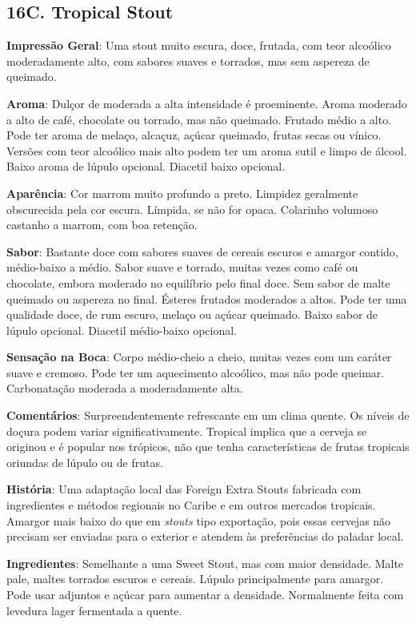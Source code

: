 \subsection*{16C. Tropical Stout}
\textbf{Impressão Geral}: Uma stout muito escura, doce, frutada, com teor alcoólico moderadamente alto, com sabores suaves e torrados, mas sem aspereza de queimado.

\textbf{Aroma}: Dulçor de moderada a alta intensidade é proeminente. Aroma moderado a alto de café, chocolate ou torrado, mas não queimado. Frutado médio a alto. Pode ter aroma de melaço, alcaçuz, açúcar queimado, frutas secas ou vínico. Versões com teor alcoólico mais alto podem ter um aroma sutil e limpo de álcool. Baixo aroma de lúpulo opcional. Diacetil baixo opcional.

\textbf{Aparência}: Cor marrom muito profundo a preto. Limpidez geralmente obscurecida pela cor escura. Límpida, se não for opaca. Colarinho volumoso castanho a marrom, com boa retenção.

\textbf{Sabor}: Bastante doce com sabores suaves de cereais escuros e amargor contido, médio-baixo a médio. Sabor suave e torrado, muitas vezes como café ou chocolate, embora moderado no equilíbrio pelo final doce. Sem sabor de malte queimado ou aspereza no final. Ésteres frutados moderados a altos. Pode ter uma qualidade doce, de rum escuro, melaço ou açúcar queimado. Baixo sabor de lúpulo opcional. Diacetil médio-baixo opcional.

\textbf{Sensação na Boca}: Corpo médio-cheio a cheio, muitas vezes com um caráter suave e cremoso. Pode ter um aquecimento alcoólico, mas não pode queimar. Carbonatação moderada a moderadamente alta.

\textbf{Comentários}: Surpreendentemente refrescante em um clima quente. Os níveis de doçura podem variar significativamente. Tropical implica que a cerveja se originou e é popular nos trópicos, não que tenha características de frutas tropicais oriundas de lúpulo ou de frutas.

\textbf{História}: Uma adaptação local das Foreign Extra Stouts fabricada com ingredientes e métodos regionais no Caribe e em outros mercados tropicais. Amargor mais baixo do que em \textit{stouts} tipo exportação, pois essas cervejas não precisam ser enviadas para o exterior e atendem às preferências do paladar local.

\textbf{Ingredientes}: Semelhante a uma Sweet Stout, mas com maior densidade. Malte pale, maltes torrados escuros e cereais. Lúpulo principalmente para amargor. Pode usar adjuntos e açúcar para aumentar a densidade. Normalmente feita com levedura lager fermentada a quente.

